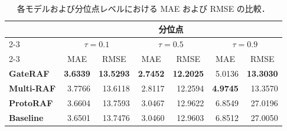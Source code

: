 \begin{table}[t]
  \caption{各モデルおよび分位点レベルにおける MAE および RMSE の比較．}
  \label{tab:metric_comparison}
  \centering
  \begin{tabular}{lrrrrrr}
    \hline
    & \multicolumn{6}{c}{分位点} \\
    \cline{2-3} \cline{4-5} \cline{6-7} 
    \multicolumn{1}{c}{モデル} & \multicolumn{2}{c}{$\tau=0.1$} & \multicolumn{2}{c}{$\tau=0.5$} & \multicolumn{2}{c}{$\tau=0.9$} \\
    \cline{2-3} \cline{4-5} \cline{6-7} 
     & \multicolumn{1}{c}{MAE} & \multicolumn{1}{c}{RMSE} & \multicolumn{1}{c}{MAE} & \multicolumn{1}{c}{RMSE} & \multicolumn{1}{c}{MAE} & \multicolumn{1}{c}{RMSE} \\
    \hline\hline
    \textbf{GateRAF} & \textbf{3.6339} & \textbf{13.5293} & \textbf{2.7452} & \textbf{12.2025} & 5.0136 & \textbf{13.3030} \\
    \textbf{Multi-RAF} & 3.7766 & 13.6118 & 2.8117 & 12.2594 & \textbf{4.9745} & 13.3570 \\
    \textbf{ProtoRAF} & 3.6604 & 13.7593 & 3.0467 & 12.9622 & 6.8549 & 27.0196 \\
    \textbf{Baseline} & 3.6501 & 13.7476 & 3.0460 & 12.9603 & 6.8512 & 27.0050 \\
    \hline
  \end{tabular}
\end{table}
